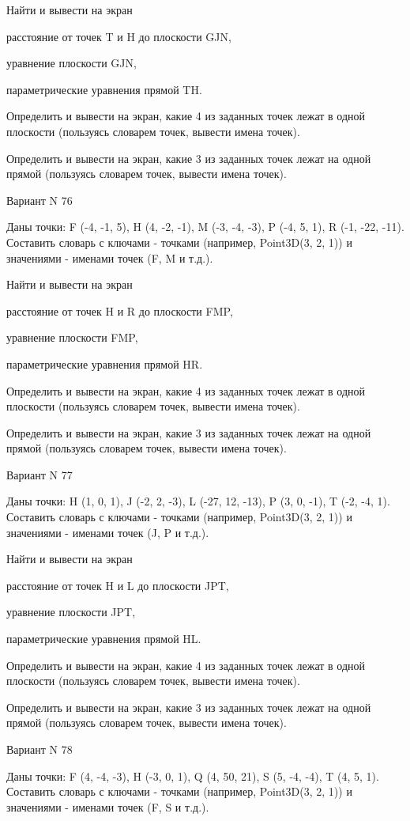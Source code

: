 \documentclass[11pt]{report}
\begin{document}
Найти и вывести на экран


расстояние от точек T и H до плоскости GJN,


уравнение плоскости GJN,


параметрические уравнения прямой TH.


Определить и вывести на экран, какие 4 из заданных точек лежат в одной плоскости (пользуясь словарем точек, вывести имена точек).


Определить и вывести на экран, какие 3 из заданных точек лежат на одной прямой (пользуясь словарем точек, вывести имена точек).

\newpage
Вариант N 76

Даны точки: F (-4, -1, 5), H (4, -2, -1), M (-3, -4, -3), P (-4, 5, 1), R (-1, -22, -11).
Составить словарь с ключами - точками (например, Point3D(3, 2, 1)) и значениями - именами точек (F, M и т.д.).


Найти и вывести на экран


расстояние от точек H и R до плоскости FMP,


уравнение плоскости FMP,


параметрические уравнения прямой HR.


Определить и вывести на экран, какие 4 из заданных точек лежат в одной плоскости (пользуясь словарем точек, вывести имена точек).


Определить и вывести на экран, какие 3 из заданных точек лежат на одной прямой (пользуясь словарем точек, вывести имена точек).

\newpage
Вариант N 77

Даны точки: H (1, 0, 1), J (-2, 2, -3), L (-27, 12, -13), P (3, 0, -1), T (-2, -4, 1).
Составить словарь с ключами - точками (например, Point3D(3, 2, 1)) и значениями - именами точек (J, P и т.д.).


Найти и вывести на экран


расстояние от точек H и L до плоскости JPT,


уравнение плоскости JPT,


параметрические уравнения прямой HL.


Определить и вывести на экран, какие 4 из заданных точек лежат в одной плоскости (пользуясь словарем точек, вывести имена точек).


Определить и вывести на экран, какие 3 из заданных точек лежат на одной прямой (пользуясь словарем точек, вывести имена точек).

\newpage
Вариант N 78

Даны точки: F (4, -4, -3), H (-3, 0, 1), Q (4, 50, 21), S (5, -4, -4), T (4, 5, 1).
Составить словарь с ключами - точками (например, Point3D(3, 2, 1)) и значениями - именами точек (F, S и т.д.).
\end{document}
